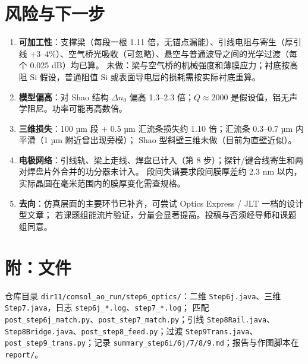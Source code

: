 \documentclass[10pt,a4paper]{article}
\newcommand{\dn}{\Delta n_0}
\begin{document}
\section{风险与下一步}
\begin{enumerate}
  \item \textbf{可加工性}：支撑梁（每段一根 1.11 倍，无锚点漏能）、引线电阻与寄生（厚引线 +3--4\%）、空气桥光吸收（可忽略）、悬空与普通波导之间的光学过渡（每个 0.025 dB）均已算。
        未做：梁与空气桥的机械强度和薄膜应力；衬底按高阻 Si 假设，普通阻值 Si 或表面导电层的损耗需按实际衬底重算。
  \item \textbf{模型偏高}：对 Shao 结构 $\dn$ 偏高 1.3--2.3 倍；$Q\approx2000$ 是假设值，铝无声学阻尼。功率可能再高数倍。
  \item \textbf{三维损失}：100 µm 段 + 0.5 µm 汇流条损失约 1.10 倍；汇流条 0.3--0.7 µm 内平滑（1 µm 附近曾出现旁模）；
        Shao 型斜壁三维未做（目前为直壁近似）。
  \item \textbf{电极网络}：引线轨、梁上走线、焊盘已计入（第 8 步）；探针/键合线寄生和两对焊盘片外合并的功分器未计入。
        段间失谐要求段间膜厚差约 2.3 nm 以内，实际晶圆在毫米范围内的膜厚变化需查规格。
  \item \textbf{去向}：仿真层面的主要环节已补齐，可尝试 Optics Express / JLT 一档的设计型文章；
        若课题组能流片验证，分量会显著提高。投稿与否须经导师和课题组同意。
\end{enumerate}

\section*{附：文件}
\footnotesize\sloppy
仓库目录 \texttt{dir11/comsol\_ao\_run/step6\_optics/}：二维 \texttt{Step6j.java}、三维 \texttt{Step7.java}，日志 \texttt{step6j\_*.log}、\texttt{step7\_*.log}；
匹配 \texttt{post\_step6j\_match.py}、\texttt{post\_step7\_match.py}；引线 \texttt{Step8Rail.java}、\texttt{Step8Bridge.java}、\texttt{post\_step8\_feed.py}；过渡 \texttt{Step9Trans.java}、\texttt{post\_step9\_trans.py}；记录 \texttt{summary\_step6i/6j/7/8/9.md}；报告与作图脚本在 \texttt{report/}。
\end{document}
